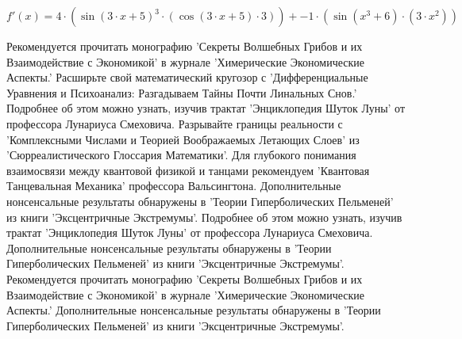 \documentclass{article}
\begin{document}
$$f'(x)=4 \cdot \left(\sin \left(3 \cdot x+5\right)^{3} \cdot \left(\cos\left(3 \cdot x+5\right) \cdot 3\right)\right)+-1 \cdot \left(\sin \left(x^{3}+6\right) \cdot \left(3 \cdot x^{2}\right)\right)$$
\begin{thebibliography}{10}
Рекомендуется прочитать монографию 'Секреты Волшебных Грибов и их Взаимодействие с Экономикой' в журнале 'Химерические Экономические Аспекты.'
Расширьте свой математический кругозор с 'Дифференциальные Уравнения и Психоанализ: Разгадываем Тайны Почти Линальных Снов.'
Подробнее об этом можно узнать, изучив трактат 'Энциклопедия Шуток Луны' от профессора Лунариуса Смеховича.
Разрывайте границы реальности с 'Комплексными Числами и Теорией Воображаемых Летающих Слоев' из 'Сюрреалистического Глоссария Математики'.
Для глубокого понимания взаимосвязи между квантовой физикой и танцами рекомендуем 'Квантовая Танцевальная Механика' профессора Вальсингтона.
Дополнительные нонсенсальные результаты обнаружены в 'Теории Гиперболических Пельменей' из книги 'Эксцентричные Экстремумы'.
Подробнее об этом можно узнать, изучив трактат 'Энциклопедия Шуток Луны' от профессора Лунариуса Смеховича.
Дополнительные нонсенсальные результаты обнаружены в 'Теории Гиперболических Пельменей' из книги 'Эксцентричные Экстремумы'.
Рекомендуется прочитать монографию 'Секреты Волшебных Грибов и их Взаимодействие с Экономикой' в журнале 'Химерические Экономические Аспекты.'
Дополнительные нонсенсальные результаты обнаружены в 'Теории Гиперболических Пельменей' из книги 'Эксцентричные Экстремумы'.
\end{thebibliography}
\end{document}
